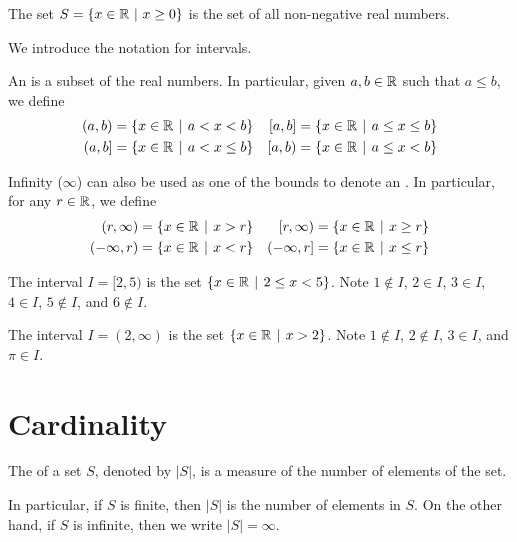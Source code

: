 \begin{example}
    The set $S = \{x \in \mathbb{R} \ | \ x \geq 0 \}$ is the set of all non-negative real numbers.
\end{example}

We introduce the notation for intervals.
\begin{definition}
    An  is a subset of the real numbers. In particular, given $a, b \in \mathbb{R}$ such that $a \leq b$, we define
    \begin{align*}
        (a,b) &= \{x \in \R \vert a < x < b\} & [a,b] &= \{x \in \R \vert a \leq x \leq b\}\\
        (a,b] &= \{x \in \R \vert a < x \leq b\} & [a,b) &= \{x \in \R \vert a \leq x < b\}
    \end{align*}

    Infinity ($\infty$) can also be used as one of the bounds to denote an . In particular, for any $r \in \mathbb{R}$, we define
    \begin{align*}
        (r, \infty) &= \{x \in \R \vert x > r\} & [r, \infty) &= \{x \in \R \vert x \geq r\}\\
        (-\infty,r) &= \{x \in \R \vert x < r\} & (-\infty,r] &= \{x \in \R \vert x \leq r\}
    \end{align*}
\end{definition}

\begin{example}
    The interval $I = [2, 5)$ is the set $\{x \in \R \vert 2 \leq x < 5\}$. Note $1 \notin I$, $2 \in I$, $3 \in I$, $4 \in I$, $5 \notin I$, and $6 \notin I$.
\end{example}

\begin{example}
    The interval $I = (2, \infty)$ is the set $\{x \in \R \vert x > 2\}$. Note $1 \notin I$, $2 \notin I$, $3 \in I$, and $\pi \in I$.
\end{example}

\section{Cardinality}
\begin{definition}
    The  of a set $S$, denoted by $|S|$, is a measure of the number of elements of the set.
    
    In particular, if $S$ is finite, then $|S|$ is the number of elements in $S$. On the other hand, if $S$ is infinite, then we write $|S| = \infty$.
\end{definition}

